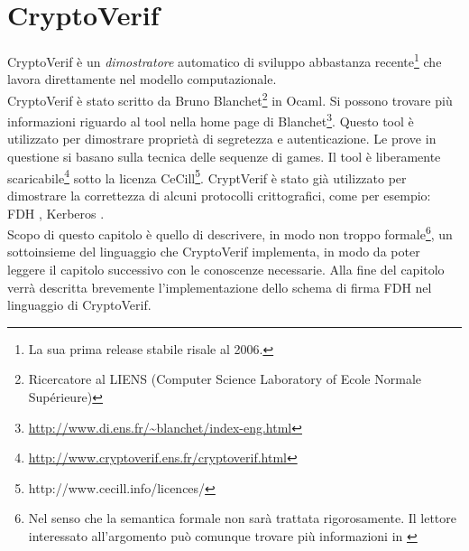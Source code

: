 \documentclass[a4paper,openright,twoside,12pt]{report}
\begin{document}
\chapter{CryptoVerif}
CryptoVerif \`e un \emph{dimostratore} automatico di sviluppo abbastanza recente\footnote{La sua prima release stabile risale al 2006.} che lavora direttamente nel modello computazionale.\\
CryptoVerif \`e stato scritto da Bruno Blanchet\footnote{Ricercatore al LIENS (Computer Science Laboratory of Ecole Normale Supérieure)} in Ocaml. 
Si possono trovare pi\`u informazioni riguardo al tool nella home page di Blanchet\footnote{\url{http://www.di.ens.fr/~blanchet/index-eng.html}}.
Questo tool \`e utilizzato per dimostrare propriet\`a di segretezza e autenticazione. Le prove in questione  si basano sulla tecnica delle sequenze di games.
Il tool \`e liberamente scaricabile\footnote{\url{http://www.cryptoverif.ens.fr/cryptoverif.html}} sotto la licenza CeCill\footnote{http://www.cecill.info/licences/}.
CryptVerif \`e stato gi\`a utilizzato per dimostrare la correttezza di alcuni protocolli crittografici, come per esempio: FDH \cite{BlanchetPointchevalCrypto06}, 
Kerberos \cite{BlanchetJaggardScedrovTsayAsiaCCS08}.\\
Scopo di questo capitolo \`e quello di descrivere, in modo non troppo formale\footnote{Nel senso che la semantica formale non sar\`a trattata rigorosamente. Il lettore interessato all'argomento pu\`o comunque trovare pi\`u informazioni in \cite{BlanchetJaggardScedrovTsayAsiaCCS08}}, 
un sottoinsieme del linguaggio che CryptoVerif implementa, in modo 
da poter leggere il capitolo successivo con le conoscenze necessarie.
Alla fine del capitolo verr\`a descritta brevemente l'implementazione dello schema di firma FDH nel linguaggio di CryptoVerif.
\newpage
\end{document}
